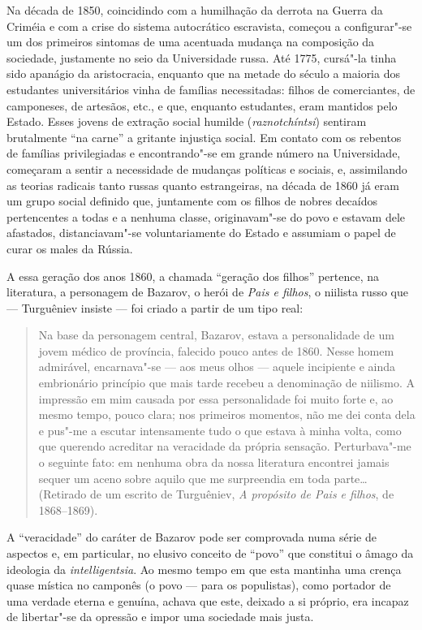 Na década de 1850, coincidindo com a humilhação da derrota na Guerra da Criméia e
com a crise do sistema autocrático escravista, começou a configurar"-se
um dos primeiros sintomas de uma acentuada mudança na composição da
sociedade, justamente no seio da Universidade russa. Até 1775, cursá"-la tinha
sido apanágio da aristocracia, enquanto que na metade do século  a
maioria dos estudantes universitários vinha de famílias necessitadas:
filhos de comerciantes, de camponeses, de artesãos, etc., e que,
enquanto estudantes, eram mantidos pelo Estado. Esses jovens de extração
social humilde (\emph{raznotchíntsi}) sentiram brutalmente ``na carne'' a
gritante injustiça social. Em contato com os rebentos de famílias
privilegiadas e encontrando"-se em grande número na Universidade,
começaram a sentir a necessidade de mudanças políticas e sociais, e,
assimilando as teorias radicais tanto russas quanto estrangeiras, na
década de 1860 já eram um grupo social definido que, juntamente com os
filhos de nobres decaídos pertencentes a todas e a nenhuma classe,
originavam"-se do povo e estavam dele afastados, distanciavam"-se
voluntariamente do Estado e assumiam o papel de curar os males da
Rússia.

A essa geração dos anos 1860, a chamada ``geração dos filhos'' pertence, na literatura, a personagem de Bazarov, o herói de \emph{Pais
e filhos}, o niilista russo que --- Turguêniev insiste --- foi criado a
partir de um tipo real:

\begin{quote}
Na base da personagem central, Bazarov, estava a personalidade de um
jovem médico de província, falecido pouco antes de 1860. Nesse homem
admirável, encarnava"-se --- aos meus olhos --- aquele incipiente e ainda
embrionário princípio que mais tarde recebeu a denominação de niilismo.
A impressão em mim causada por essa personalidade foi muito forte e, ao
mesmo tempo, pouco clara; nos primeiros momentos, não me dei conta dela
e pus"-me a escutar intensamente tudo o que estava à minha volta, como
que querendo acreditar na veracidade da própria sensação. Perturbava"-me
o seguinte fato: em nenhuma obra da nossa literatura encontrei jamais
sequer um aceno sobre aquilo que me surpreendia em toda parte\ldots{}
(Retirado de um escrito de Turguêniev, \emph{A propósito
de \emph{Pais e filhos}}, de 1868--1869).
\end{quote}

A ``veracidade'' do caráter de Bazarov pode ser comprovada numa série de
aspectos e, em particular, no elusivo conceito de ``povo'' que constitui
o âmago da ideologia da \emph{intelligentsia}. Ao mesmo tempo em que esta
mantinha uma crença quase mística no camponês (o povo --- para os
populistas), como portador de uma verdade eterna e genuína, achava que
este, deixado a si próprio, era incapaz de libertar"-se da opressão e
impor uma sociedade mais justa. 

